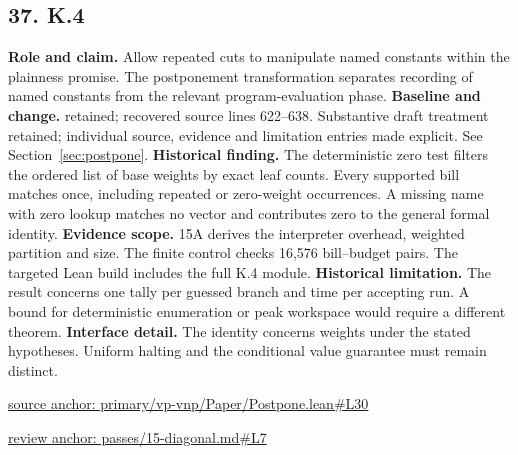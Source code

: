 \documentclass[11pt,letterpaper]{article}
\theoremstyle{definition}\newtheorem{definition}[theorem]{Definition}\newtheorem{example}[theorem]{Example}
\theoremstyle{remark}\newtheorem{remark}[theorem]{Remark}
\begin{document}
\subsection*{37. K.4}
\textbf{Role and claim.} Allow repeated cuts to manipulate named constants within the plainness promise. The postponement transformation separates recording of named constants from the relevant program-evaluation phase.
\textbf{Baseline and change.} retained; recovered source lines 622--638. Substantive draft treatment retained; individual source, evidence and limitation entries made explicit. See Section~\ref{sec:postpone}.
\textbf{Historical finding.} The deterministic zero test filters the ordered list of base weights by exact leaf counts. Every supported bill matches once, including repeated or zero-weight occurrences. A missing name with zero lookup matches no vector and contributes zero to the general formal identity.
\textbf{Evidence scope.} 15A derives the interpreter overhead, weighted partition and size. The finite control checks 16,576 bill–budget pairs. The targeted Lean build includes the full K.4 module.
\textbf{Historical limitation.} The result concerns one tally per guessed branch and time per accepting run. A bound for deterministic enumeration or peak workspace would require a different theorem.
\textbf{Interface detail.} The identity concerns weights under the stated hypotheses. Uniform halting and the conditional value guarantee must remain distinct.
\par\href{https://github.com/nousentllc/VP-VNP-Review/blob/8a7976933b6b2b4ffda1ad3a0dfb5fc6b6f023e8/primary/vp-vnp/Paper/Postpone.lean\#L30}{source anchor: primary/vp-vnp/Paper/Postpone.lean\#L30}
\par\href{https://github.com/nousentllc/VP-VNP-Review/blob/8a7976933b6b2b4ffda1ad3a0dfb5fc6b6f023e8/passes/15-diagonal.md\#L7}{review anchor: passes/15-diagonal.md\#L7}
\goodbreak
\end{document}
